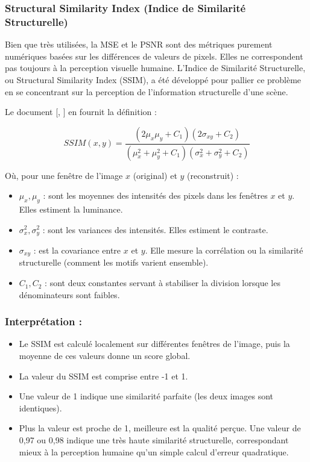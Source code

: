 \subsubsection{Structural Similarity Index (Indice de Similarité Structurelle)}

Bien que très utilisées, la MSE et le PSNR sont des métriques purement numériques basées sur les différences de valeurs de pixels. Elles ne correspondent pas toujours à la perception visuelle humaine. L'Indice de Similarité Structurelle, ou Structural Similarity Index (SSIM), a été développé pour pallier ce problème en se concentrant sur la perception de l'information structurelle d'une scène.

Le document [\cite{26}, \cite{27}] en fournit la définition :

\begin{equation}
SSIM(x,y) = \frac{(2\mu_x\mu_y + C_1)(2\sigma_{xy} + C_2)}{(\mu_x^2 + \mu_y^2 + C_1)(\sigma_x^2 + \sigma_y^2 + C_2)}
\end{equation}

Où, pour une fenêtre de l'image \(x\) (original) et \(y\) (reconstruit) :
\begin{itemize}
    \item[-] \(\mu_x, \mu_y\) : sont les moyennes des intensités des pixels dans les fenêtres \(x\) et \(y\). Elles estiment la luminance.
    \item[-] \(\sigma_x^2, \sigma_y^2\) : sont les variances des intensités. Elles estiment le contraste.
    \item[-] \(\sigma_{xy}\) : est la covariance entre \(x\) et \(y\). Elle mesure la corrélation ou la similarité structurelle (comment les motifs varient ensemble).
    \item[-] \(C_1, C_2\) : sont deux constantes servant à stabiliser la division lorsque les dénominateurs sont faibles.
\end{itemize}

\subsubsection*{Interprétation :}
\begin{itemize}
    \item[-] Le SSIM est calculé localement sur différentes fenêtres de l'image, puis la moyenne de ces valeurs donne un score global.
    \item[-] La valeur du SSIM est comprise entre -1 et 1.
    \item[-] Une valeur de 1 indique une similarité parfaite (les deux images sont identiques).
    \item[-] Plus la valeur est proche de 1, meilleure est la qualité perçue. Une valeur de 0,97 ou 0,98 indique une très haute similarité structurelle, correspondant mieux à la perception humaine qu'un simple calcul d'erreur quadratique.
\end{itemize}

